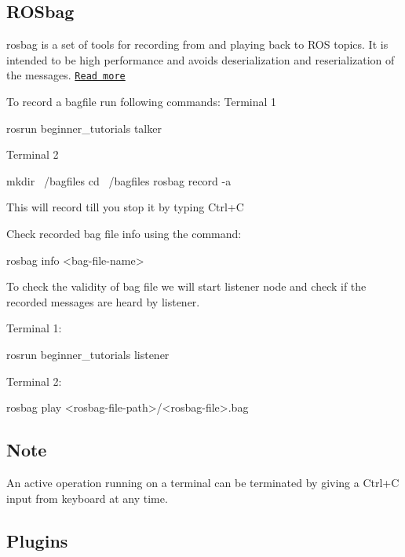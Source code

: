 \subsection*{R\+O\+Sbag}

rosbag is a set of tools for recording from and playing back to R\+OS topics. It is intended to be high performance and avoids deserialization and reserialization of the messages. \href{http://wiki.ros.org/rosbag}{\tt Read more}

To record a bagfile run following commands\+: Terminal 1 
\begin{DoxyCode}
rosrun beginner\_tutorials talker
\end{DoxyCode}
 Terminal 2 
\begin{DoxyCode}
mkdir ~/bagfiles
cd ~/bagfiles
rosbag record -a
\end{DoxyCode}
 This will record till you stop it by typing Ctrl+C

Check recorded bag file info using the command\+: 
\begin{DoxyCode}
rosbag info <bag-file-name>
\end{DoxyCode}


To check the validity of bag file we will start listener node and check if the recorded messages are heard by listener.

Terminal 1\+: 
\begin{DoxyCode}
rosrun beginner\_tutorials listener
\end{DoxyCode}


Terminal 2\+: 
\begin{DoxyCode}
rosbag play <rosbag-file-path>/<rosbag-file>.bag
\end{DoxyCode}


\subsection*{Note}

An active operation running on a terminal can be terminated by giving a Ctrl+C input from keyboard at any time.

\subsection*{Plugins}


